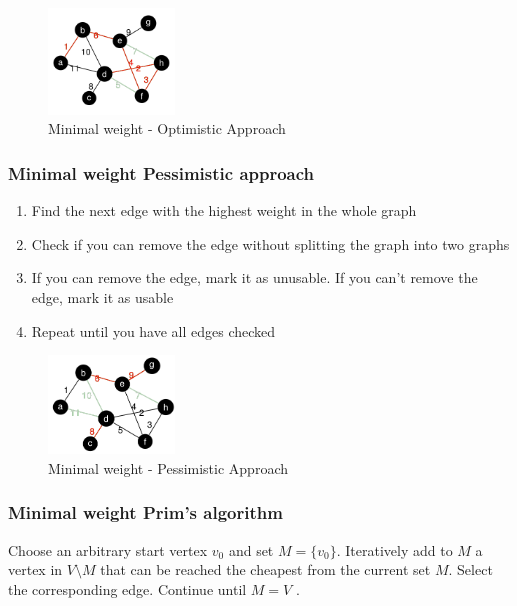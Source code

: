 \begin{figure}[H]
\centering
\includegraphics[width=0.3\textwidth]{figures/optimisticGraphAlg.png}
\caption{Minimal weight - Optimistic Approach}
\end{figure}

\subsubsection{Minimal weight Pessimistic approach}


\begin{enumerate}
    \item Find the next edge with the highest weight in the whole graph
    \item Check if you can remove the edge without splitting the graph into two graphs
    \item If you can remove the edge, mark it as unusable. If you can't remove the edge, mark it as usable
    \item Repeat until you have all edges checked
\end{enumerate}

\begin{figure}[H]
\centering
\includegraphics[width=0.3\textwidth]{figures/pessimisticGraphAlg.png}
\caption{Minimal weight - Pessimistic Approach}
\end{figure}

\clearpage
\subsubsection{Minimal weight Prim's algorithm}
Choose an arbitrary start vertex $v_0$ and set $M = \{v_0\}$.
Iteratively add to $M$ a vertex in $V \setminus M$ that can be reached the
cheapest from the current set $M$. Select the corresponding
edge. Continue until $M = V$ .

